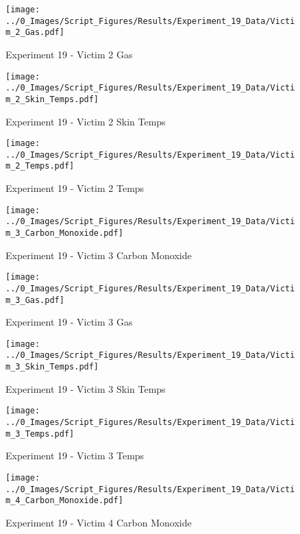 	\clearpage

	\begin{figure}[H]
		\centering
		\texttt{[image: ../0\_Images/Script\_Figures/Results/Experiment\_19\_Data/Victim\_2\_Gas.pdf]}
		\caption[]{Experiment 19 - Victim 2 Gas}
	\end{figure}
 

	\begin{figure}[H]
		\centering
		\texttt{[image: ../0\_Images/Script\_Figures/Results/Experiment\_19\_Data/Victim\_2\_Skin\_Temps.pdf]}
		\caption[]{Experiment 19 - Victim 2 Skin Temps}
	\end{figure}
 
	\clearpage

	\begin{figure}[H]
		\centering
		\texttt{[image: ../0\_Images/Script\_Figures/Results/Experiment\_19\_Data/Victim\_2\_Temps.pdf]}
		\caption[]{Experiment 19 - Victim 2 Temps}
	\end{figure}
 

	\begin{figure}[H]
		\centering
		\texttt{[image: ../0\_Images/Script\_Figures/Results/Experiment\_19\_Data/Victim\_3\_Carbon\_Monoxide.pdf]}
		\caption[]{Experiment 19 - Victim 3 Carbon Monoxide}
	\end{figure}
 
	\clearpage

	\begin{figure}[H]
		\centering
		\texttt{[image: ../0\_Images/Script\_Figures/Results/Experiment\_19\_Data/Victim\_3\_Gas.pdf]}
		\caption[]{Experiment 19 - Victim 3 Gas}
	\end{figure}
 

	\begin{figure}[H]
		\centering
		\texttt{[image: ../0\_Images/Script\_Figures/Results/Experiment\_19\_Data/Victim\_3\_Skin\_Temps.pdf]}
		\caption[]{Experiment 19 - Victim 3 Skin Temps}
	\end{figure}
 
	\clearpage

	\begin{figure}[H]
		\centering
		\texttt{[image: ../0\_Images/Script\_Figures/Results/Experiment\_19\_Data/Victim\_3\_Temps.pdf]}
		\caption[]{Experiment 19 - Victim 3 Temps}
	\end{figure}
 

	\begin{figure}[H]
		\centering
		\texttt{[image: ../0\_Images/Script\_Figures/Results/Experiment\_19\_Data/Victim\_4\_Carbon\_Monoxide.pdf]}
		\caption[]{Experiment 19 - Victim 4 Carbon Monoxide}
	\end{figure}
 

